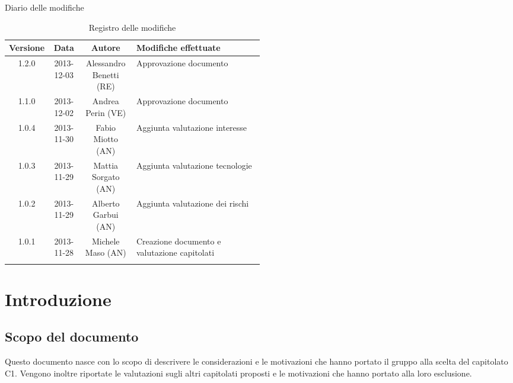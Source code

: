 
\newpage
Diario delle modifiche
\begin{center}
\begin{longtable}{|c|c|c|p{0.5\linewidth}|}
\toprule
\textbf{Versione} & \textbf{Data} & \textbf{Autore} & \textbf{Modifiche effettuate}\\

\midrule
1.2.0 & 2013-12-03 & Alessandro Benetti (RE) & Approvazione documento\\
\midrule
1.1.0 & 2013-12-02 & Andrea Perin (VE) & Approvazione documento\\
\midrule
1.0.4 & 2013-11-30 & Fabio Miotto (AN) & Aggiunta valutazione interesse\\
\midrule
1.0.3 & 2013-11-29 & Mattia Sorgato (AN) & Aggiunta valutazione tecnologie\\
\midrule
1.0.2 & 2013-11-29 & Alberto Garbui (AN) & Aggiunta valutazione dei rischi\\
\midrule
1.0.1 & 2013-11-28 & Michele Maso (AN) & Creazione documento e valutazione capitolati\\

\bottomrule
\caption{Registro delle modifiche}
\label{tab:changelog}
\end{longtable}
\end{center}

\newpage
\tableofcontents

\newpage
\listoftables
\listoffigures

\newpage
\section{Introduzione}%
\label{1.0}
\subsection{Scopo del documento}%
\label{1.1}
Questo documento nasce con lo scopo di descrivere le considerazioni e le motivazioni che hanno portato il gruppo alla scelta del capitolato C1. Vengono inoltre riportate le valutazioni sugli altri capitolati proposti e le motivazioni che hanno portato alla loro esclusione.

